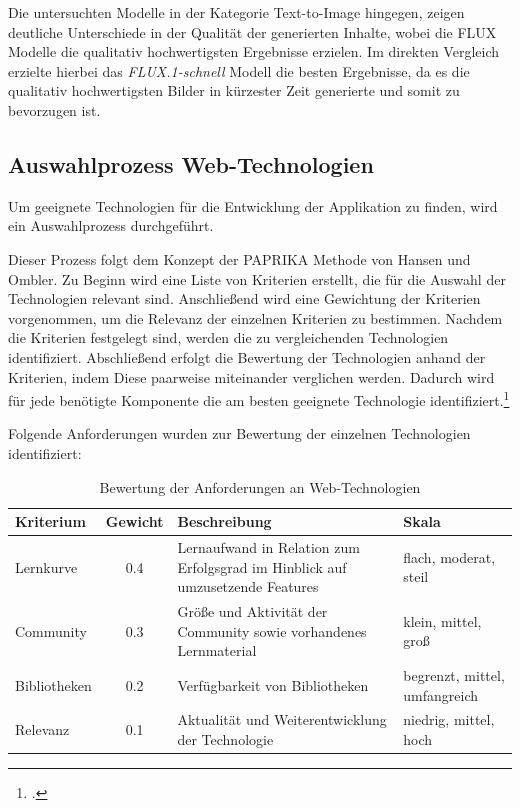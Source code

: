 Die untersuchten Modelle in der Kategorie Text-to-Image hingegen, zeigen deutliche Unterschiede in der Qualität der generierten Inhalte, wobei die FLUX Modelle die qualitativ hochwertigsten Ergebnisse erzielen.
Im direkten Vergleich erzielte hierbei das \textit{FLUX.1-schnell} Modell die besten Ergebnisse, da es die qualitativ hochwertigsten Bilder in kürzester Zeit generierte und somit zu bevorzugen ist.
\clearpage

\subsection{Auswahlprozess Web-Technologien}
Um geeignete Technologien für die Entwicklung der Applikation zu finden, wird ein Auswahlprozess durchgeführt.

Dieser Prozess folgt dem Konzept der PAPRIKA Methode von Hansen und Ombler.
Zu Beginn wird eine Liste von Kriterien erstellt, die für die Auswahl der Technologien relevant sind.
Anschließend wird eine Gewichtung der Kriterien vorgenommen, um die Relevanz der einzelnen Kriterien zu bestimmen.
Nachdem die Kriterien festgelegt sind, werden die zu vergleichenden Technologien identifiziert.
Abschließend erfolgt die Bewertung der Technologien anhand der Kriterien, indem Diese paarweise miteinander verglichen werden.
Dadurch wird für jede benötigte Komponente die am besten geeignete Technologie identifiziert.\footcite{Paprika2008}

Folgende Anforderungen wurden zur Bewertung der einzelnen Technologien identifiziert:

\begin{table}[htbp]
  \centering
  \begin{tabular}{|p{2cm}|c|p{5cm}|p{4cm}|}
      \hline
      \textbf{Kriterium} & \textbf{Gewicht} & \textbf{Beschreibung} & \textbf{Skala}\\ \hline
      {Lernkurve} & 0.4 & Lernaufwand in Relation zum Erfolgsgrad im Hinblick auf umzusetzende Features & flach, moderat, steil\\ \hline
      {Community} & 0.3 & Größe und Aktivität der Community sowie vorhandenes Lernmaterial & klein, mittel, groß\\ \hline
      {Bibliotheken} & 0.2 & Verfügbarkeit von Bibliotheken & begrenzt, mittel, umfangreich\\ \hline
      {Relevanz} & 0.1 & Aktualität und Weiterentwicklung der Technologie & niedrig, mittel, hoch\\ \hline
  \end{tabular}
  \caption{Bewertung der Anforderungen an Web-Technologien}\label{tab:table}
\end{table}

